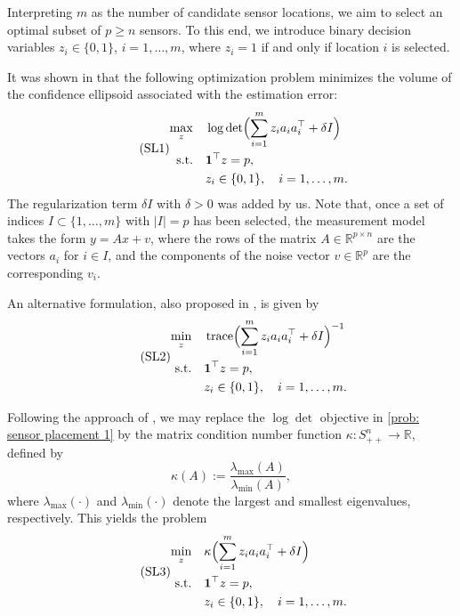 \documentclass[12pt]{amsart}
\theoremstyle{plain}
\theoremstyle{definition}
\begin{document}
Interpreting $m$ as the number of candidate sensor locations, we aim to select an optimal subset of $p \ge n$ sensors. To this end, we introduce binary decision variables $z_i \in \{0,1\}$, $i = 1, \dots, m$, where $z_i = 1$ if and only if location $i$ is selected.

It was shown in \cite{Joshi2009} that the following optimization problem minimizes the volume of the confidence ellipsoid associated with the estimation error:
\begin{equation}
\tag{SL1}
\label{prob: sensor placement 1}
\begin{aligned}
\max_z \quad & \log \det \Bigl( \sum_{i=1}^m z_i a_i a_i^\top + \delta I \Bigr) \\
\text{s.t.} \quad & \mathbf{1}^\top z = p, \\
& z_i \in \{0,1\}, \quad i = 1, \dots, m.
\end{aligned}
\end{equation}
The regularization term $\delta I$ with $\delta > 0$ was added by us. Note that, once a set of indices $I \subset \{1, \dots, m\}$ with $|I| = p$ has been selected, the measurement model takes the form $y = Ax + v$, where the rows of the matrix $A \in \mathbb{R}^{p \times n}$ are the vectors $a_i$ for $i \in I$, and the components of the noise vector $v \in \mathbb{R}^p$ are the corresponding $v_i$.

An alternative formulation, also proposed in \cite{Joshi2009}, is given by
\begin{equation}
\tag{SL2}
\label{prob: sensor placement 2}
\begin{aligned}
\min_z \quad & \operatorname{trace} \Bigl( \sum_{i=1}^m z_i a_i a_i^\top + \delta I \Bigr)^{-1} \\
\text{s.t.} \quad & \mathbf{1}^\top z = p, \\
& z_i \in \{0,1\}, \quad i = 1, \dots, m.
\end{aligned}
\end{equation}

Following the approach of \cite{singh2005determining,krener2009measures,hinson2014observability}, we may replace the $\log\det$ objective in \eqref{prob: sensor placement 1} by the matrix condition number function $\kappa : S_{++}^n \to \mathbb{R}$, defined by
\[
\kappa(A) := \frac{\lambda_{\max}(A)}{\lambda_{\min}(A)},
\]
where $\lambda_{\max}(\cdot)$ and $\lambda_{\min}(\cdot)$ denote the largest and smallest eigenvalues, respectively. This yields the problem
\begin{equation}
\tag{SL3}
\label{prob: sensor placement 3}
\begin{aligned}
\min_z \quad & \kappa\Bigl( \sum_{i=1}^m z_i a_i a_i^\top + \delta I \Bigr) \\
\text{s.t.} \quad & \mathbf{1}^\top z = p, \\
& z_i \in \{0,1\}, \quad i = 1, \dots, m.
\end{aligned}
\end{equation}
\end{document}
